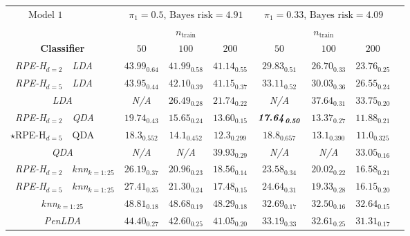 \documentclass{amsart}
\providecommand{\tabularnewline}{\\}
\begin{document}
\begin{table}[p]
	\small
	\begin{centering}
		\begin{tabular}{r|l|c|c|c|c|c|c|c}
			\multicolumn{1}{r}{$\boxed{\text{Model 1}}$} & \multicolumn{1}{l}{} & \multicolumn{3}{c}{$\pi_{1}=0.5$, $\text{Bayes risk}=4.91$} & \multicolumn{3}{c}{$\pi_{1}=0.33$, $\text{Bayes risk}=4.09$} & \tabularnewline
			\multicolumn{1}{r}{} &  & \multicolumn{3}{c|}{$n_{\mathrm{train}}$} & \multicolumn{3}{c|}{$n_{\mathrm{train}}$} & \tabularnewline
			\multicolumn{2}{c|}{\textbf{Classifier}} & $50$ & $100$ & $200$ & $50$ & $100$ & $200$ & \tabularnewline
			\hline 
			\emph{RPE-H$_{d=2}$} & \emph{LDA} & $\mathit{43.99_{0.64}}$ & $\mathit{41.99_{0.58}}$ & $\mathit{41.14_{0.55}}$ & $\mathit{29.83_{0.51}}$ & $\mathit{26.70_{0.33}}$ & $\mathit{23.76_{0.25}}$ & \tabularnewline
			\hline 
			\emph{RPE-H$_{d=5}$} & \emph{LDA} & $\mathit{43.95_{0.44}}$ & $\mathit{42.10_{0.39}}$ & $\mathit{41.15_{0.37}}$ & $\mathit{33.11_{0.52}}$ & $\mathit{30.03_{0.36}}$ & $\mathit{26.55_{0.24}}$ & \tabularnewline
			\hline 
			\multicolumn{2}{c|}{\emph{LDA}} & \emph{N/A} & $\mathit{26.49_{0.28}}$ & $\mathit{21.74_{0.22}}$ & \emph{N/A} & $\mathit{37.64_{0.31}}$ & $\mathit{33.75_{0.20}}$ & \tabularnewline
			\hline 
			\emph{RPE-H$_{d=2}$} & \emph{QDA} & $\mathit{19.74_{0.43}}$ & $\mathit{15.65_{0.24}}$ & $\mathit{13.60_{0.15}}$ & $\mbox{\textbf{\emph{17.64}}}_{\text{\textbf{\emph{0.50}}}}$ & $\mathit{13.37_{0.27}}$ & $\mathit{11.88_{0.21}}$ & \tabularnewline
			\hline 
			$\star$RPE-H$_{d=5}$ & QDA & $\mathbf{18.3_{0.552}}$ & $\mathbf{14.1_{0.452}}$ & $\mathbf{12.3_{0.299}}$ & $18.8_{0.657}$ & $13.1_{0.390}$ & $11.0_{0.325}$ & \tabularnewline
			\hline 
			\multicolumn{2}{c|}{\emph{QDA}} & \emph{N/A} & \emph{N/A} & $\mathit{39.93_{0.29}}$ & \emph{N/A} & \emph{N/A} & $\mathit{33.05_{0.16}}$ & \tabularnewline
			\hline 
			\emph{RPE-H$_{d=2}$} & \emph{$k$nn$_{k=1:25}$} & $\mathit{26.19_{0.37}}$ & $\mathit{20.96_{0.23}}$ & $\mathit{18.56_{0.14}}$ & $\mathit{23.58_{0.34}}$ & $\mathit{20.02_{0.22}}$ & $\mathit{16.58_{0.21}}$ & \tabularnewline
			\hline 
			\emph{RPE-H$_{d=5}$} & \emph{$k$nn$_{k=1:25}$} & $\mathit{27.41_{0.35}}$ & $\mathit{21.30_{0.24}}$ & $\mathit{17.48_{0.15}}$ & $\mathit{24.64_{0.31}}$ & $\mathit{19.33_{0.28}}$ & $\mathit{16.15_{0.20}}$ & \tabularnewline
			\hline 
			\multicolumn{2}{c|}{\emph{$k$nn$_{k=1:25}$}} & $\mathit{48.81_{0.18}}$ & $\mathit{48.68_{0.19}}$ & $\mathit{48.29_{0.18}}$ & $\mathit{32.69_{0.17}}$ & $\mathit{32.50_{0.16}}$ & $\mathit{32.64_{0.15}}$ & \tabularnewline
			\hline 
			\hline 
			\multicolumn{2}{c|}{\emph{PenLDA}} & $\mathit{44.40_{0.27}}$ & $\mathit{42.60_{0.25}}$ & $\mathit{41.05_{0.20}}$ & $\mathit{33.19_{0.33}}$ & $\mathit{32.61_{0.25}}$ & $\mathit{31.31_{0.17}}$ & \tabularnewline

\end{tabular}
\end{centering}
\end{table}
\end{document}
